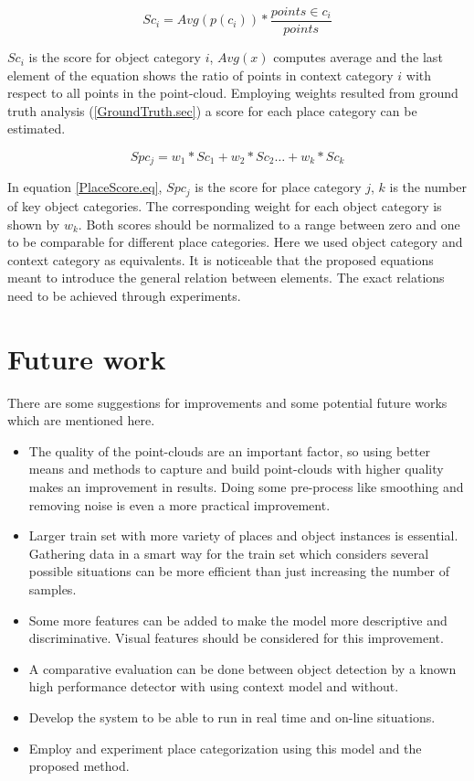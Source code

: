 \begin{equation}
 \label{contextScore.eq}
Sc_i = Avg(p(c_i)) * \frac{points \in c_i}{points} 
\end{equation}

$Sc_i$ is the score for object category $i$, $Avg(x)$ computes average and the last element of the equation shows the ratio
of points in context category $i$ with respect to all points in the point-cloud. 
Employing weights resulted from ground truth analysis (\ref{GroundTruth.sec}) a score for each place category can be 
estimated.

\begin{equation}
 \label{PlaceScore.eq}
 Spc_j = w_1 * Sc_1 + w_2 * Sc_2 \ldots + w_k * Sc_k
\end{equation}

In equation \ref{PlaceScore.eq}, $Spc_j$ is the score for place category $j$, $k$ is the number of key object categories.
The corresponding weight for each object category is shown by $w_k$. 
Both scores should be normalized to a range between zero and one to be comparable for different place categories. 
Here we used object category and context category as equivalents.
It is noticeable that the proposed equations meant to introduce the general relation between elements.
The exact relations need to be achieved through experiments. 





\section{Future work}

There are some suggestions for improvements and some potential future works which are mentioned here.
\begin{itemize}
 \item The quality of the point-clouds are an important factor, so using better means and methods to capture and build 
 point-clouds with higher quality makes an improvement in results. Doing some pre-process like smoothing and removing noise
 is even a more practical improvement.
 \item Larger train set with more variety of places and object instances is essential. Gathering data in a smart way
  for the train set which considers several possible situations can be more efficient than just increasing the number of samples.
 \item Some more features can be added to make the model more descriptive and discriminative. 
  Visual features should be considered for this improvement.
 \item A comparative evaluation can be done between object detection by a known high performance detector with using context model
  and without.
 \item Develop the system to be able to run in real time and on-line situations.
 \item Employ and experiment place categorization using this model and the proposed method.
\end{itemize} 
